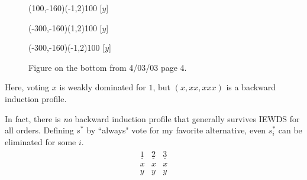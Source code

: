 \documentclass[12pt]{article}
\newcommand{\n}{\noindent}
\newcommand{\s}{\vspace{5mm}}
\begin{document}
\begin{figure}[htb]
\begin{egame}
\putbranch(100,-160)(-1,2){100}
[$y$]

\renewcommand{\egarrowstyle}{}

\putbranch(-300,-160)(1,2){100}
[$y$]

\renewcommand{\egarrowstyle}{e}

\putbranch(-300,-160)(-1,2){100}
[$y$]


%
\end{egame}
\hspace*{\fill}\s\s\s\s\s\s\s\s\s
\caption[]{Figure on the bottom from 4/03/03 page 4.}\label{f:four}
\end{figure}

\n Here, voting $x$ is weakly dominated for $1$, but $(x,xx,xxx)$ is a backward induction profile.

\s
\n  In fact, there is \textit{no} backward induction profile that generally survives IEWDS for all orders.  Defining $s^*$ by ``always" vote for my favorite alternative, even $s_i^*$ can be eliminated for some $i$.  
\begin{eqnarray*}
\begin{array}{ccc}
\underline{1}&\underline{2}&\underline{3}\\
x&x&x\\
y&y&y\\
\end{array}
\end{eqnarray*}
\end{document}
